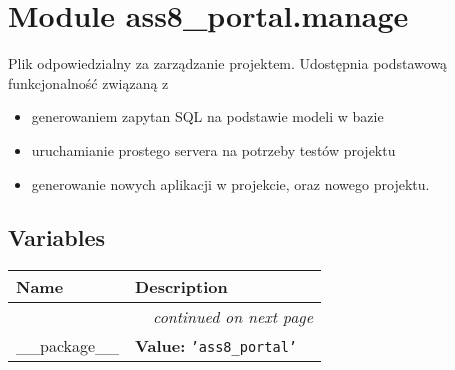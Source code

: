 %
%
%


\section{Module ass8\_portal.manage}

    \label{ass8_portal:manage}
Plik odpowiedzialny za zarządzanie projektem. Udostępnia podstawową 
funkcjonalność związaną z

\begin{itemize}
\setlength{\parskip}{0.6ex}
  \item generowaniem zapytan SQL na podstawie modeli w bazie

  \item uruchamianie prostego servera na potrzeby testów projektu

  \item generowanie nowych aplikacji w projekcie, oraz nowego projektu.

\end{itemize}



  \subsection{Variables}

    \vspace{-1cm}
\hspace{\varindent}\begin{longtable}{|p{\varnamewidth}|p{\vardescrwidth}|l}
\cline{1-2}
\cline{1-2} \centering \textbf{Name} & \centering \textbf{Description}& \\
\cline{1-2}
\endhead\cline{1-2}\multicolumn{3}{r}{\small\textit{continued on next page}}\\\endfoot\cline{1-2}
\endlastfoot\raggedright \_\-\_\-p\-a\-c\-k\-a\-g\-e\-\_\-\_\- & \raggedright \textbf{Value:} 
{\tt \texttt{'}\texttt{ass8\_portal}\texttt{'}}&\\
\cline{1-2}
\end{longtable}

